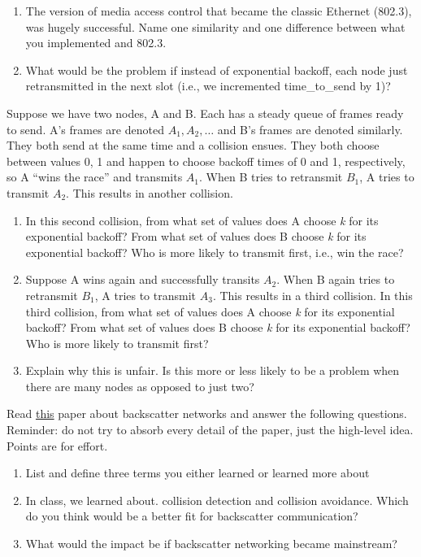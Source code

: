 \documentclass[10pt]{article}
\newenvironment{problem}[2][Problem]{\begin{trivlist}
\item[\hskip \labelsep {\bfseries #1}\hskip \labelsep {\bfseries #2.}]}{\end{trivlist}}
\begin{document}
\begin{problem}{1: Responding to Collisions}
\begin{enumerate}[label=(\alph*)]
\item The version of media access control that became the classic Ethernet (802.3), was hugely successful. Name one similarity and one difference between what you implemented and 802.3. 

\item What would be the problem if instead of exponential backoff, each node just retransmitted in the next slot (i.e., we incremented time\_to\_send by 1)?

\end{enumerate}
\end{problem}
\begin{problem}{2: Channel Capture}
Suppose we have two nodes, A and B. Each has a steady queue of frames ready to send. A's frames are denoted $A_{1}, A_{2}, \ldots$ and B's frames are denoted similarly. They both send at the same time and a collision ensues. They both choose between values {0, 1} and happen to choose backoff times of 0 and 1, respectively, so A ``wins the race'' and transmits $A_{1}$. When B tries to retransmit $B_{1}$, A tries to transmit $A_{2}$. This results in another collision.
\begin{enumerate}[label=(\alph*)]
\item In this second collision, from what set of values does A choose \textit{k} for its exponential backoff? From what set of values does B choose \textit{k} for its exponential backoff? Who is more likely to transmit first, i.e., win the race?
\item Suppose A wins again and successfully transits $A_{2}$. When B again tries to retransmit $B_{1}$, A tries to transmit $A_{3}$. This results in a third collision. In this third collision, from what set of values does A choose \textit{k} for its exponential backoff? From what set of values does B choose \textit{k} for its exponential backoff? Who is more likely to transmit first?
\item Explain why this is unfair. Is this more or less likely to be a problem when there are many nodes as opposed to just two?
\end{enumerate}
\end{problem}
\begin{problem}{3: Reading}
Read \href{https://modernmobile.cs.washington.edu/docs/abc.pdf}{this} paper about backscatter networks and answer the following questions. Reminder: do not try to absorb every detail of the paper, just the high-level idea. Points are for effort.
\begin{enumerate}
    \item List and define three terms you either learned or learned more about
    \item In class, we learned about. collision detection and collision avoidance. Which do you think would be a better fit for backscatter communication?
    \item What would the impact be if backscatter networking became mainstream?
\end{enumerate}
\end{problem}
\end{document}

